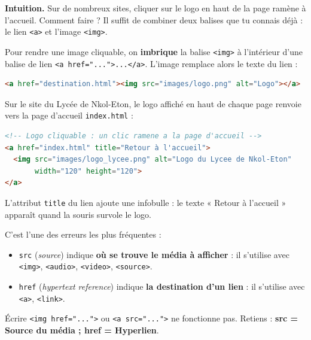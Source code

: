 \documentclass[11pt]{article}
\newcommand{\cle}[1]{{\popxbold\color{popdark}#1}}
\newcounter{popsec}
\newcounter{popsub}
\newcommand{\courssub}[1]{%
  \stepcounter{popsub}%
  \par\vspace{9pt}\noindent{\popxbold\fontsize{11.5}{13}\selectfont\color{popink}{\color{poporange}\thepopsec.\thepopsub}\hspace{6pt}#1}\par\nopagebreak\vspace{4pt}
}
\begin{document}
\courssub{L'image cliquable}

\textbf{Intuition.} Sur de nombreux sites, cliquer sur le logo en haut de la page ramène à l'accueil. Comment faire ? Il suffit de combiner deux balises que tu connais déjà : le lien \texttt{<a>} et l'image \texttt{<img>}.

\begin{propriete}
Pour rendre une image cliquable, on \textbf{imbrique} la balise \texttt{<img>} à l'intérieur d'une balise de lien \texttt{<a href="...">...</a>}. L'image remplace alors le texte du lien :
\begin{lstlisting}[language=HTML]
<a href="destination.html"><img src="images/logo.png" alt="Logo"></a>
\end{lstlisting}
\end{propriete}

\begin{exemplebox}
Sur le site du Lycée de Nkol-Eton, le logo affiché en haut de chaque page renvoie vers la page d'accueil \texttt{index.html} :
\begin{lstlisting}[language=HTML]
<!-- Logo cliquable : un clic ramene a la page d'accueil -->
<a href="index.html" title="Retour à l'accueil">
  <img src="images/logo_lycee.png" alt="Logo du Lycee de Nkol-Eton"
       width="120" height="120">
</a>
\end{lstlisting}
L'attribut \texttt{title} du lien ajoute une \cle{infobulle} : le texte « Retour à l'accueil » apparaît quand la souris survole le logo.
\end{exemplebox}

\begin{attention}
C'est l'une des erreurs les plus fréquentes :
\begin{itemize}
  \item \texttt{src} (\emph{source}) indique \textbf{où se trouve le média à afficher} : il s'utilise avec \texttt{<img>}, \texttt{<audio>}, \texttt{<video>}, \texttt{<source>}.
  \item \texttt{href} (\emph{hypertext reference}) indique \textbf{la destination d'un lien} : il s'utilise avec \texttt{<a>}, \texttt{<link>}.
\end{itemize}
Écrire \texttt{<img href="...">} ou \texttt{<a src="...">} ne fonctionne pas. Retiens : \textbf{src = Source du média ; href = Hyperlien}.
\end{attention}
\end{document}
